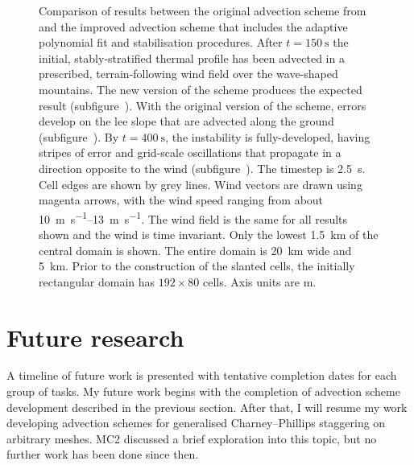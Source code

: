 \documentclass[a4paper,11pt]{article}
\begin{document}
\begin{figure}
%
	\caption{Comparison of results between the original advection scheme from \citet{weller-shahrokhi2014} and the improved advection scheme that includes the adaptive polynomial fit and stabilisation procedures.  After $t = \SI{150}{\second}$ the initial, stably-stratified thermal profile has been advected in a prescribed, terrain-following wind field over the wave-shaped mountains.  The new version of the scheme produces the expected result (subfigure~).  With the original version of the scheme, errors develop on the lee slope that are advected along the ground (subfigure~).
By $t = \SI{400}{\second}$, the instability is fully-developed, having stripes of error and grid-scale oscillations that propagate in a direction opposite to the wind (subfigure~).
The timestep is \SI{2.5}{\second}.
Cell edges are shown by grey lines.  Wind vectors are drawn using magenta arrows, with the wind speed ranging from about \SIrange{10}{13}{\meter\per\second}.  The wind field is the same for all results shown and the wind is time invariant.  Only the lowest \SI{1.5}{\kilo\meter} of the central domain is shown.  The entire domain is \SI{20}{\kilo\meter} wide and \SI{5}{\kilo\meter}.  Prior to the construction of the slanted cells, the initially rectangular domain has $192 \times 80$ cells.  Axis units are \si{\meter}.}
\label{fig:instability}
\end{figure}

\section{Future research}
\label{sec:future}
A timeline of future work is presented with tentative completion dates for each group of tasks.
My future work begins with the completion of advection scheme development described in the previous section.  After that, I will resume my work developing advection schemes for generalised Charney--Phillips staggering on arbitrary meshes.
MC2 discussed a brief exploration into this topic, but no further work has been done since then.
\end{document}
